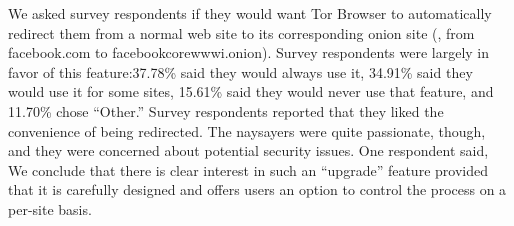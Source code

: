 We asked survey respondents if they would want Tor Browser to automatically redirect them from
a normal web site to its corresponding onion site (\eg, from facebook.com to
facebookcorewwwi.onion). Survey respondents were largely
in favor of this feature:37.78\% said they would always use it, 34.91\% said
they would use it for some sites, 15.61\% said they would never use that feature,   and
11.70\% chose ``Other.'' Survey respondents reported that they liked the convenience of being redirected.
The naysayers were quite passionate, though, and they were concerned about
potential security issues. One respondent said, 
We conclude that there is clear interest in such an ``upgrade'' feature provided
that it is carefully designed and offers users an option to control the process
on a per-site basis.

